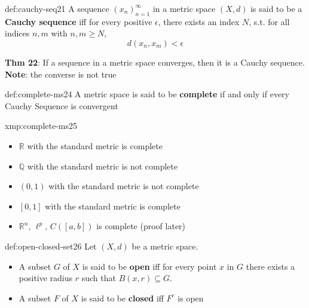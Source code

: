 \documentclass[landscape, 8pt]{extarticle}
\begin{document}
\begin{multicols}{3}

\begin{dfn}{def:cauchy-seq}{21}
    A sequence $(x_{n})^{\infty}_{n=1}$ in a metric space $(X,d)$ is said to be a \textbf{Cauchy sequence} iff for every positive $\epsilon$, there exists an index $N$, s.t. for all indices $n,m$ with $n,m\ge N$,
    \[d(x_{n}, x_{m}) < \epsilon\]

    \longrule{0.08ex}
    \textbf{Thm 22}: If a sequence in a metric space converges, then it is a Cauchy sequence. \textbf{Note}: the converse is not true
\end{dfn}

\begin{dfn}{def:complete-ms}{24}
    A metric space is said to be \textbf{complete} if and only if every Cauchy Sequence is convergent
\end{dfn}

\begin{xmp}{xmp:complete-ms}{25}
    \begin{itemize}
        \item $\mathbb{R}$ with the standard metric is complete
        \item $\mathbb{Q}$ with the standard metric is not complete
        \item $(0,1)$ with the standard metric is not complete
        \item $[0,1]$ with the standard metric is complete
        \item $\mathbb{R}^{n},\,\ell^{p},\,C([a,b])$ is complete (proof later)
    \end{itemize} 
\end{xmp}

\begin{dfn}{def:open-closed-set}{26}
    \vspace{-5pt}
    Let $(X,d)$ be a metric space.
    \vspace{-5pt}
    \begin{itemize}
        \item A subset $G$ of $X$ is said to be \textbf{open} iff for every point $x$ in $G$ there exists a positive radius $r$ such that $B(x,r)\subseteq G$.
        \item A subset $F$ of $X$ is said to be \textbf{closed} iff $F^{c}$ is open
    \end{itemize}
\end{dfn}


\end{multicols}
\end{document}
